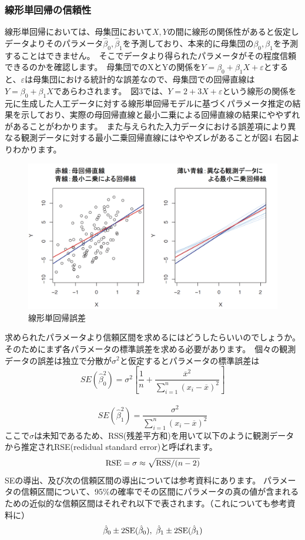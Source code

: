 \documentclass[uplatex]{jsarticle}
\begin{document}
\subsubsection{線形単回帰の信頼性}
線形単回帰においては、母集団において$X, Y$の間に線形の関係性があると仮定しデータよりそのパラメータ$\hat{\beta}_0, \hat{\beta}_1$を予測しており、本来的に母集団の$\beta_0, \beta_1$を予測することはできません。\
そこでデータより得られたパラメータがその程度信頼できるのかを確認します。\
母集団でのXとYの関係を$Y = \beta_0 + \beta_1X + \varepsilon$とすると、$\varepsilon$は母集団における統計的な誤差なので、母集団での回帰直線は$Y=\beta_0 + \beta_1X$であらわされます。\
図3では、$Y = 2 + 3X + \varepsilon$という線形の関係を元に生成した人工データに対する線形単回帰モデルに基づくパラメータ推定の結果を示しており、実際の母回帰直線と最小二乗による回帰直線の結果にややずれがあることがわかります。\
また与えられた入力データにおける誤差項により異なる観測データに対する最小二乗回帰直線にはややズレがあることが図4 右図よりわかります。
\begin{figure}
  \begin{center}
    \includegraphics[width=13cm]{img/lienar_error.png}
    \caption{線形単回帰誤差}
  \end{center}
\end{figure}

求められたパラメータより信頼区間を求めるにはどうしたらいいのでしょうか。そのためにまず各パラメータの標準誤差を求める必要があります。\
個々の観測データの誤差は独立で分散が$\sigma ^2$と仮定するとパラメータの標準誤差は
$$SE(\hat{\beta}_0^2) = \sigma^2 \left[\frac{1}{n} + \frac{\overline{x}^2}{\sum_{i=1}^n (x_i - \overline{x})^2}\right]$$\
$$SE(\hat{\beta}_1 ^2) = \frac{\sigma^2}{\sum_{i=1}^n (x_i - \overline{x})^2}$$
ここで$\sigma$は未知であるため、{\rm RSS}(残差平方和)を用いて以下のように観測データから推定されRSE(redidual standard error)と呼ばれます。
$${\rm RSE} = \sigma \approx \sqrt{{\rm RSS}/(n-2)}$$
SEの導出、及び次の信頼区間の導出については参考資料にあります。
パラメータの信頼区間について、95$\%$の確率でその区間にパラメータの真の値が含まれるための近似的な信頼区間はそれぞれ以下で表されます。（これについても参考資料に）
$$\hat{\beta}_0 \pm 2{\rm SE}(\hat{\beta}_0), \ \hat{\beta}_1 \pm 2{\rm SE}(\hat{\beta}_1)$$
\end{document}
